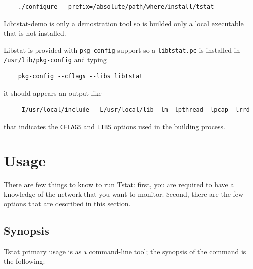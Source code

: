 \documentclass[11pt]{article}
\begin{document}
\begin{small}\begin{verbatim}
    ./configure --prefix=/absolute/path/where/install/tstat
\end{verbatim}\end{small} \noindent
Libtstat-demo is only a demostration tool so is builded only a local
executable that is not installed.



Libstat is provided with \texttt{pkg-config} support so a \texttt{libtstat.pc} is installed in
\texttt{/usr/lib/pkg-config} and typing

\begin{small}\begin{verbatim}
    pkg-config --cflags --libs libtstat
\end{verbatim}\end{small} \noindent
it should appears an output like

\begin{small}\begin{verbatim}
    -I/usr/local/include  -L/usr/local/lib -lm -lpthread -lpcap -lrrd
\end{verbatim}\end{small} \noindent
that indicates the \texttt{CFLAGS} and \texttt{LIBS} options used in the building
process.

\section{Usage\label{Usage}}


There are few things to know to run Tstat: first, you are required to have a
knowledge of the network that you want to monitor. 
Second, there are the few options that are described in this section.

\subsection{Synopsis\label{Synopsis}}


Tstat primary usage is as a command-line tool; the synopsis of 
the command is the following:
\end{document}

